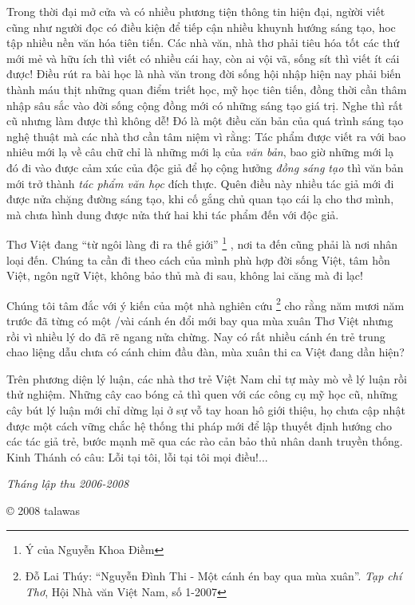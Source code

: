 \documentclass[../main.tex]{subfiles}
\begin{document}
\begin{multicols}{2}
Trong thời đại mở cửa và có nhiều phương tiện thông tin hiện đại, ngừời viết cũng như người đọc có điều kiện để tiếp cận nhiều khuynh hướng sáng tạo, hoc tập nhiều nền văn hóa tiên tiến. Các nhà văn, nhà thơ phải tiêu hóa tốt các thứ mới mẻ và hữu ích thì viết có nhiều cái hay, còn ai vội vã, sống sít thì viết ít cái được! Điều rút ra bài học là nhà văn trong đời sống hội nhập hiện nay phải biến thành máu thịt những quan điểm triết học, mỹ học tiên tiến, đồng thời cần thâm nhập sâu sắc vào đời sống cộng đồng mới có những sáng tạo giá trị. Nghe thì rất cũ nhưng làm được thì không dễ! Đó là một điều căn bản của quá trình sáng tạo nghệ thuật mà các nhà thơ cần tâm niệm vì rằng: Tác phẩm được viết ra với bao nhiêu mới lạ về câu chữ chỉ là những mới lạ của \textit{văn bản}, bao giờ những mới lạ đó đi vào được cảm xúc của độc giả để họ cộng hưởng \textit{đồng sáng tạo} thì văn bản mới trở thành \textit{tác phẩm văn học} đích thực. Quên điều này nhiều tác giả mới đi được nửa chặng đường sáng tạo, khi cố gắng chủ quan tạo cái lạ cho thơ mình, mà chưa hình dung được nửa thứ hai khi tác phẩm đến với độc giả. 
 
Thơ Việt đang “từ ngôi làng đi ra thế giới” \footnote{
Ý của Nguyễn Khoa Điềm} , nơi ta đến cũng phải là nơi nhân loại đến. Chúng ta cần đi theo cách của mình phù hợp đời sống Việt, tâm hồn Việt, ngôn ngữ Việt, không bảo thủ mà đi sau, không lai căng mà đi lạc! 
 
Chúng tôi tâm đắc với ý kiến của một nhà nghiên cứu \footnote{
Đỗ Lai Thúy: “Nguyễn Đình Thi - Một cánh én bay qua mùa xuân”. \textit{Tạp chí Thơ}, Hội Nhà văn Việt Nam, số 1-2007}  cho rằng năm mươi năm trước đã từng có một /vài cánh én đổi mới bay qua mùa xuân Thơ Việt nhưng rồi vì nhiều lý do đã rẽ ngang nửa chừng. Nay có rất nhiều cánh én trẻ trung chao liệng dẫu chưa có cánh chim đầu đàn, mùa xuân thi ca Việt đang dần hiện? 
 
Trên phương diện lý luận, các nhà thơ trẻ Việt Nam chỉ tự mày mò về lý luận rồi thử nghiệm. Những cây cao bóng cả thì quen với các công cụ mỹ học cũ, những cây bút lý luận mới chỉ dừng lại ở sự vỗ tay hoan hô giới thiệu, họ chưa cập nhật được một cách vững chắc hệ thống thi pháp mới để lập thuyết định hướng cho các tác giả trẻ, bước mạnh mẽ qua các rào cản bảo thủ nhân danh truyền thống. Kinh Thánh có câu: Lỗi tại tôi, lỗi tại tôi mọi điều!...        
 
\textit{Tháng lập thu 2006-2008} 
 
© 2008 talawas        




\end{multicols}
\end{document}
